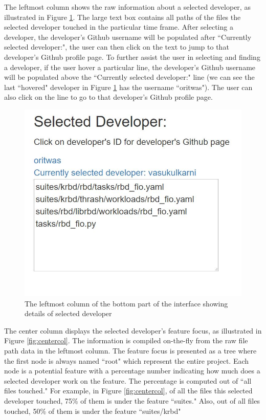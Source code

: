 \documentclass{article}
\begin{document}
The leftmost column shows the raw information about a selected developer, as illustrated in Figure \ref{fig:leftmost}. The large text box contains all paths of the files the selected developer touched in the particular time frame. After selecting a developer, the developer's Github username will be populated after ``Currently selected developer:", the user can then click on the text to jump to that developer's Github profile page. To further assist the user in selecting and finding a developer, if the user hover a particular line, the developer's Github username will be populated above the ``Currently selected developer:" line (we can see the last ``hovered" developer in Figure \ref{fig:leftmost} has the username ``oritwas"). The user can also click on the line to go to that developer's Github profile page.

\begin{figure}[h!]
\centering
\includegraphics[scale=0.6]{images/leftmost.JPG}
\caption{The leftmost column of the bottom part of the interface showing details of selected developer}
\label{fig:leftmost}
\end{figure}

The center column displays the selected developer's feature focus, as illustrated in Figure \ref{fig:centercol}. The information is compiled on-the-fly from the raw file path data in the leftmost column. The feature focus is presented as a tree where the first node is always named ``root" which represent the entire project. Each node is a potential feature with a percentage number indicating how much does a selected developer work on the feature. The percentage is computed out of ``all files touched." For example, in Figure \ref{fig:centercol}, of all the files this selected developer touched, 75\% of them is under the feature ``suites." Also, out of all files touched, 50\% of them is under the feature ``suites/krbd"
\end{document}
